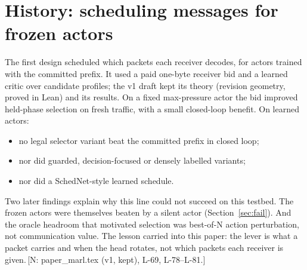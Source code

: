 \documentclass[11pt]{article}
\theoremstyle{definition}
\newif\ifshownotes\shownotestrue
\newcommand{\NOTE}[1]{\ifshownotes{\color{notecol}\,\textsf{\footnotesize[N: #1]}}\fi}
\begin{document}
\section{History: scheduling messages for frozen actors}\label{app:history}
The first design scheduled which packets each receiver decodes, for actors trained with the committed prefix. It used a
paid one-byte receiver bid and a learned critic over candidate profiles; the v1 draft kept its theory (revision
geometry, proved in Lean) and its results. On a fixed max-pressure actor the bid improved held-phase selection on fresh
traffic, with a small closed-loop benefit. On learned actors:
\begin{itemize}
\item no legal selector variant beat the committed prefix in closed loop;
\item nor did guarded, decision-focused or densely labelled variants;
\item nor did a SchedNet-style learned schedule.
\end{itemize}
Two later findings explain why this line could not succeed on this testbed. The frozen actors were themselves beaten by
a silent actor (Section~\ref{sec:fail}). And the oracle headroom that motivated selection was best-of-N action
perturbation, not communication value. The lesson carried into this paper: the lever is what a packet carries and when
the head rotates, not which packets each receiver is given.\NOTE{paper\_marl.tex (v1, kept), L-69, L-78--L-81.}
\end{document}
